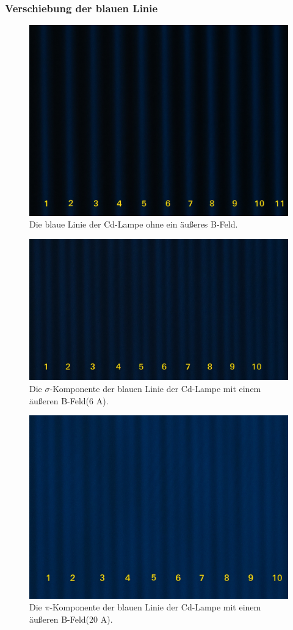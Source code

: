 \subsubsection{Verschiebung der blauen Linie}
\begin{figure}[H]
  \centering
  \includegraphics[width=0.8\linewidth]{Bilder/BoB.JPG}
  \caption{Die blaue Linie der Cd-Lampe ohne ein äußeres B-Feld.}
  \label{fig:BoB}
\end{figure}

\begin{figure}[H]
  \centering
  \includegraphics[width=0.8\linewidth]{Bilder/B6ASig.JPG}
  \caption{Die $\sigma$-Komponente der blauen Linie der Cd-Lampe mit einem äußeren B-Feld(6 A).}
  \label{fig:B6ASig}
\end{figure}

\begin{figure}[H]
  \centering
  \includegraphics[width=0.8\linewidth]{Bilder/B20APi.JPG}
  \caption{Die $\pi$-Komponente der blauen Linie der Cd-Lampe mit einem äußeren B-Feld(20 A).}
  \label{fig:B20APi}
\end{figure}

